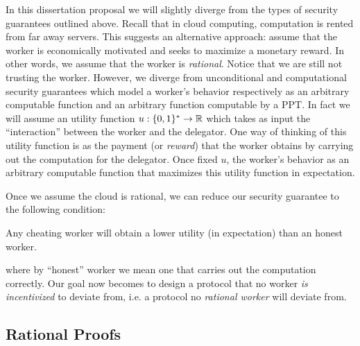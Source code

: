 In this dissertation proposal we will slightly diverge from the types of security guarantees outlined above. Recall that in cloud computing, computation is rented from far away servers. This suggests an alternative approach: assume that the worker is economically motivated and seeks to maximize a monetary reward. In other words, we assume that the worker is \textit{rational}. Notice that we are still not trusting the worker. However, we diverge from unconditional and computational security guarantees which model a worker's behavior respectively as an arbitrary computable function and an arbitrary function computable by a PPT. In fact we will assume an utility function $u: \{0, 1\}^{*} \to \mathbb{R}$ which takes as input the ``interaction'' between the worker and the delegator. One way of thinking of this utility function is as the payment (or \textit{reward}) that the worker obtains by carrying out the computation for the delegator. Once fixed $u$, the worker's behavior as an arbitrary computable function that maximizes this utility function in expectation.


Once we assume the cloud is rational, we can reduce our security guarantee to the following condition:
\begin{displayquote}
	Any cheating worker will obtain a lower utility (in expectation) than an honest worker.
\end{displayquote}
 where by ``honest'' worker we mean one that carries out the computation correctly.
Our goal now becomes to design a protocol that no worker \textit{is incentivized} to deviate from, i.e. a protocol no \textit{rational worker} will deviate from. 




\subsection{Rational Proofs}











